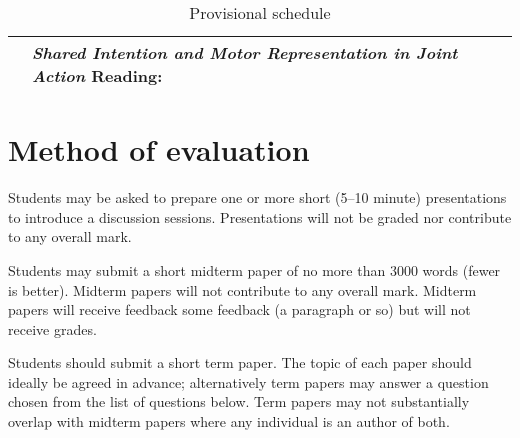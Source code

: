 \documentclass[12pt,\papersize]{extarticle}
\begin{document}
{\begin{table}[htbp]
\begin{center}
\begin{tabular*}{1\textwidth}{ l l m{} }
	& \textit{Shared Intention and Motor Representation in Joint Action}
		\newline Reading: \citet{Knoblich:2008hy,kourtis:2010_favoritism}
\\
%
\bottomrule
%
\end{tabular*}
\caption{Provisional schedule}
\label{table:schedule}
\end{center}	%
\end{table}
}



\section{Method of evaluation}

Students may be asked to prepare one or more short (5--10 minute) presentations to introduce a discussion sessions. 
Presentations will not be graded nor contribute to any overall mark. 

Students may submit a short midterm paper of no more than 3000 words (fewer is better).
Midterm papers will not contribute to any overall mark.   
Midterm papers will receive feedback some feedback (a paragraph or so) but will not receive grades.

Students should submit a short term paper.  
The topic of each paper should ideally be agreed in advance; alternatively term papers may answer a question chosen from the list of questions below. 
Term papers may not substantially overlap with midterm papers where any individual is an author of both.
\end{document}
